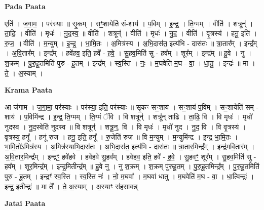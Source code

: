 \documentclass[17pt]{extarticle}
\begin{document}
\textbf{Pada Paata} \newline

एति॑ । ज॒गा॒म॒ । पर॑स्याः ॥ सृ॒कम् । सꣳ॒॒शायेति॑ सं-शाय॑ । प॒विम् । इ॒न्द्र॒ । ति॒ग्मम् । वीति॑ । शत्रून्॑ । ता॒ढि॒ । वीति॑ । मृधः॑ । नु॒द॒स्व॒ ॥ वीति॑ । शत्रून्॑ । वीति॑ । मृधः॑ । नु॒द॒ । वीति॑ । वृ॒त्रस्य॑ । हनू॒ इति॑ । रु॒ज॒ ॥ वीति॑ । म॒न्युम् । इ॒न्द्र॒ । भा॒मि॒तः । अ॒मित्र॑स्य । अ॒भि॒दास॑त॒ इत्य॑भि - दास॑तः ॥ त्रा॒तार᳚म् । इन्द्र᳚म् । अ॒वि॒तार᳚म् । इन्द्र᳚म् । हवे॑हव॒ इति॒ हवे᳚ - ह॒वे॒ । सु॒हव॒मिति॑ सु - हव᳚म् । शूर᳚म् । इन्द्र᳚म् ॥ हु॒वे । नु । श॒क्रम् । पु॒रु॒हू॒तमिति॑ पुरु - हू॒तम् । इन्द्र᳚म् । स्व॒स्ति । नः॒ । म॒घवेति॑ म॒घ - वा॒ । धा॒तु॒ । इन्द्रः॑ ॥ मा । ते॒ । अ॒स्याम् ।  \newline


\textbf{Krama Paata} \newline

आ ज॑गाम । ज॒गा॒मा॒ पर॑स्याः । पर॑स्या॒ इति॒ पर॑स्याः ॥ सृ॒कꣳ सꣳ॒॒शाय॑ । सꣳ॒॒शाय॑ प॒विम् । सꣳ॒॒शायेति॑ सम् - शाय॑ । प॒विमि॑न्द्र । इ॒न्द्र॒ ति॒ग्मम् । ति॒ग्मं ॅवि । वि शत्रून्॑ । शत्रू᳚न् ताढि । ता॒ढि॒ वि । वि मृधः॑ । मृधो॑ नुदस्व । नु॒द॒स्वेति॑ नुदस्व ॥ वि शत्रून्॑ । शत्रू॒न्॒. वि । वि मृधः॑ । मृधो॑ नुद । नु॒द॒ वि । वि वृ॒त्रस्य॑ । वृ॒त्रस्य॒ हनू᳚ । हनू॑ रुज । हनू॒ इति॒ हनू᳚ । रु॒जेति॑ रुज ॥ वि म॒न्युम् । म॒न्युमि॑न्द्र । इ॒न्द्र॒ भा॒मि॒तः । भा॒मि॒तो॑ऽमित्र॑स्य । अ॒मित्र॑स्याभि॒दास॑तः । अ॒भि॒दास॑त॒ इत्य॑भि - दास॑तः ॥ त्रा॒तार॒मिन्द्र᳚म् । इन्द्र॑मवि॒तार᳚म् । अ॒वि॒तार॒मिन्द्र᳚म् । इन्द्रꣳ॒॒ हवे॑हवे । हवे॑हवे सु॒हव᳚म् । हवे॑हव॒ इति॒ हवे᳚ - ह॒वे॒ । सु॒हवꣳ॒॒ शूर᳚म् । सु॒हव॒मिति॑ सु - हव᳚म् । शूर॒मिन्द्र᳚म् । इन्द्र॒मितीन्द्र᳚म् ॥ हु॒वे नु । नु श॒क्रम् । श॒क्रम् पु॑रुहू॒तम् । पु॒रु॒हू॒तमिन्द्र᳚म् । पु॒रु॒हू॒तमिति॑ पुरु - हू॒तम् । इन्द्रꣳ॑ स्व॒स्ति । स्व॒स्ति नः॑ । नो॒ म॒घवा᳚ । म॒घवा॑ धातु । म॒घवेति॑ म॒घ - वा॒ । धा॒त्विन्द्रः॑ । इन्द्र॒ इतीन्द्रः॑ ॥ मा ते᳚ । ते॒ अ॒स्याम् । अ॒स्याꣳ स॑हसावन्न् \newline

\textbf{Jatai Paata} \newline
\end{document}
